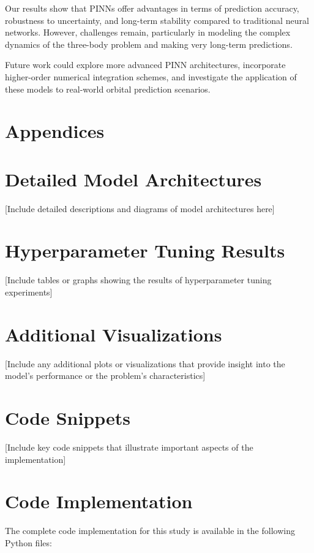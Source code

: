 \documentclass[12pt,a4paper]{article}
\begin{document}
Our results show that PINNs offer advantages in terms of prediction accuracy, robustness to uncertainty, and long-term stability compared to traditional neural networks. However, challenges remain, particularly in modeling the complex dynamics of the three-body problem and making very long-term predictions.

Future work could explore more advanced PINN architectures, incorporate higher-order numerical integration schemes, and investigate the application of these models to real-world orbital prediction scenarios.




\section{Appendices}

\appendix

\section{Detailed Model Architectures}
\label{appendix:model_architectures}

[Include detailed descriptions and diagrams of model architectures here]

\section{Hyperparameter Tuning Results}
\label{appendix:hyperparameter_tuning}

[Include tables or graphs showing the results of hyperparameter tuning experiments]

\section{Additional Visualizations}
\label{appendix:additional_visualizations}

[Include any additional plots or visualizations that provide insight into the model's performance or the problem's characteristics]

\section{Code Snippets}
\label{appendix:code_snippets}

[Include key code snippets that illustrate important aspects of the implementation]
\section{Code Implementation}
\label{sec:appendix}
The complete code implementation for this study is available in the following Python files:
\end{document}
